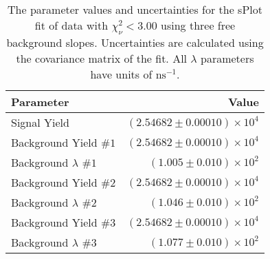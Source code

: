 
\begin{table}[ht]
    \begin{center}
        \begin{tabular}{lr}\toprule
            Parameter & Value \\\midrule
            Signal Yield & $(2.54682 \pm 0.00010) \times 10^{4}$ \\
            Background Yield $\#1$ & $(2.54682 \pm 0.00010) \times 10^{4}$ \\
            Background $\lambda$ $\#1$ & $(1.005 \pm 0.010) \times 10^{2}$ \\
            Background Yield $\#2$ & $(2.54682 \pm 0.00010) \times 10^{4}$ \\
            Background $\lambda$ $\#2$ & $(1.046 \pm 0.010) \times 10^{2}$ \\
            Background Yield $\#3$ & $(2.54682 \pm 0.00010) \times 10^{4}$ \\
            Background $\lambda$ $\#3$ & $(1.077 \pm 0.010) \times 10^{2}$ \\\bottomrule
        \end{tabular}
        \caption{The parameter values and uncertainties for the sPlot fit of data with $\chi^2_\nu < 3.00$ using three free background slopes. Uncertainties are calculated using the covariance matrix of the fit. All $\lambda$ parameters have units of $\si{\nano\second}^{-1}$.}\label{tab:splot-fit-results-chisqdof-3.00-free-3}
    \end{center}
\end{table}

